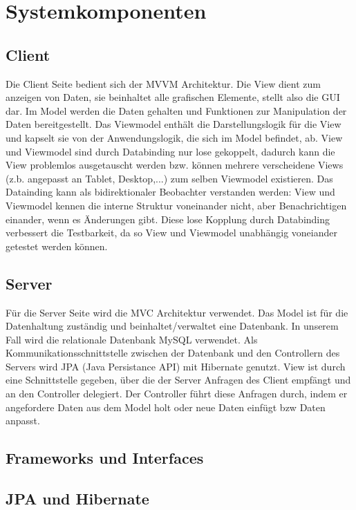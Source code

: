 \documentclass[a4paper]{scrreprt}
\begin{document}
\section{Systemkomponenten}

\subsection{Client}
Die Client Seite bedient sich der MVVM Architektur. Die View dient zum anzeigen von Daten, sie beinhaltet alle grafischen Elemente, stellt also die GUI dar. Im Model werden die Daten gehalten und Funktionen zur Manipulation der Daten bereitgestellt.
Das Viewmodel enthält die Darstellungslogik für die View und kapselt sie von der Anwendungslogik, die sich im Model befindet, ab.
View und Viewmodel sind durch Databinding nur lose gekoppelt, dadurch kann die View problemlos ausgetauscht werden bzw. können mehrere verscheidene Views (z.b. angepasst an Tablet, Desktop,...) zum selben Viewmodel existieren.
Das Datainding kann als bidirektionaler Beobachter verstanden werden: View und Viewmodel kennen die interne Struktur voneinander nicht, aber Benachrichtigen einander, wenn es Änderungen gibt. Diese lose Kopplung durch Databinding verbessert die Testbarkeit, da so View und Viewmodel unabhängig voneiander getestet werden können.

\subsection{Server}
Für die Server Seite wird die MVC Architektur verwendet.
Das Model ist für die Datenhaltung zuständig und beinhaltet/verwaltet eine Datenbank.  In unserem Fall wird die relationale Datenbank MySQL verwendet. Als Kommunikationsschnittstelle zwischen der Datenbank und den Controllern des Servers wird JPA (Java Persistance API) mit Hibernate genutzt.
View ist durch eine Schnittstelle gegeben, über die der Server Anfragen des Client empfängt und an den Controller delegiert. Der Controller führt diese Anfragen durch, indem er angefordere Daten aus dem Model holt oder neue Daten einfügt bzw Daten anpasst.

\subsection{Frameworks und Interfaces}
\subsection*{JPA und Hibernate}
\end{document}
